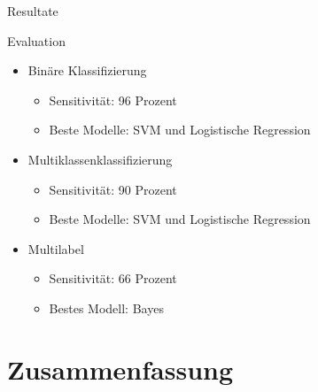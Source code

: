\documentclass[aspectratio=169]{beamer} %
\begin{document}
\begin{frame}{Resultate}
    \begin{block}{Evaluation}
        \begin{itemize}
            \item Binäre Klassifizierung
                  \begin{itemize}
                      \item Sensitivität: 96 Prozent
                      \item Beste Modelle: SVM und Logistische Regression
                  \end{itemize}
            \item Multiklassenklassifizierung
                  \begin{itemize}
                      \item Sensitivität: 90 Prozent
                      \item Beste Modelle: SVM und Logistische Regression
                  \end{itemize}
            \item Multilabel
                  \begin{itemize}
                      \item Sensitivität: 66 Prozent
                      \item Bestes Modell: Bayes
                  \end{itemize}
        \end{itemize}
    \end{block}
\end{frame}

\section{Zusammenfassung}
\end{document}
